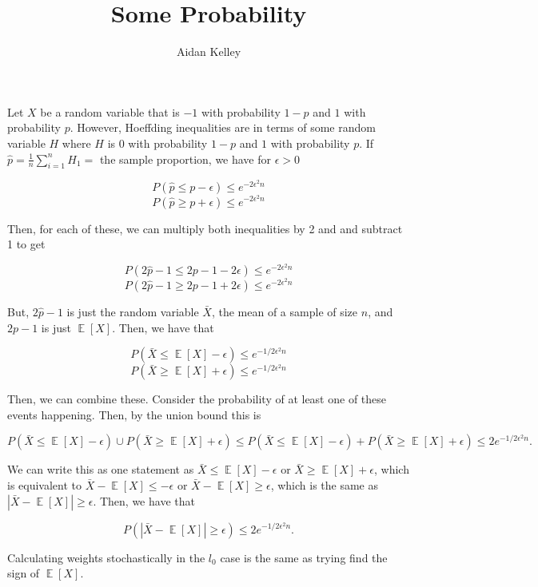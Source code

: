\documentclass{article}
\title{Some Probability}
\author{Aidan Kelley}
\newcommand{\e}{\epsilon}
\DeclareMathOperator*{\E}{\mathbb{E}}
\DeclareMathOperator{\1}{\mathbb{1}}
\begin{document}
\maketitle

Let $X$ be a random variable that is $-1$ with probability $1-p$ and $1$ with probability $p$. However, Hoeffding inequalities are in terms of some random variable $H$ where $H$ is $0$ with probability $1-p$ and $1$ with probability $p$. If $\hat{p} = \frac{1}{n} \sum_{i = 1}^n H_1 =$ the sample proportion, we have for $\e > 0$

$$P(\hat{p} \le p - \e) \le e^{-2\e^2n}$$
$$P(\hat{p} \ge p + \e) \le e^{-2\e^2n}$$

Then, for each of these, we can multiply both inequalities by 2 and and subtract 1 to get

$$P(2\hat{p} -1 \le 2p -1 - 2\e) \le e^{-2\e^2n}$$
$$P(2\hat{p} -1 \ge 2p -1 + 2\e) \le e^{-2\e^2n}$$

But, $2\hat{p} - 1$ is just the random variable $\bar{X}$, the mean of a sample of size $n$, and $2p - 1$ is just $\E[X]$. Then, we have that

$$P(\bar{X} \le \E[X] - \e) \le e^{-1/2 \e^2 n}$$
$$P(\bar{X} \ge \E[X] + \e) \le e^{-1/2 \e^2 n}$$

Then, we can combine these. Consider the probability of at least one of these events happening. Then, by the union bound this is

$$P(\bar{X} \le \E[X] - \e) \cup P(\bar{X} \ge \E[X] + \e)
\le P(\bar{X} \le \E[X] - \e) + P(\bar{X} \ge \E[X] + \e)
\le 2 e^{-1/2 \e^2 n}.$$

We can write this as one statement as $\bar{X} \le \E[X] - \e$ or $\bar{X} \ge \E[X] + \e$, which is equivalent to $\bar{X} - \E[X] \le -\e$ or $\bar{X} - \E[X] \ge \e$, which is the same as $|\bar{X} - \E[X]| \ge \e$. Then, we have that

$$P(| \bar{X} - \E[X]| \ge \e) \le 2 e^{-1/2 \e^2 n}.$$

Calculating weights stochastically in the $l_0$ case is the same as trying find the sign of $\E[X]$. 
\end{document}
